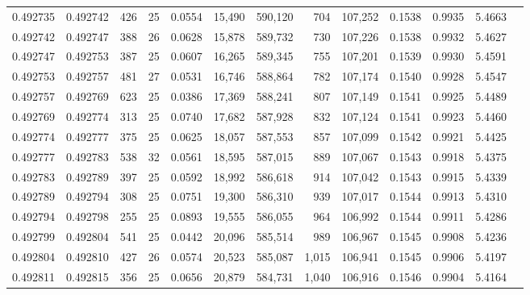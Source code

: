 \begin{tabular}{rrrrrrrrrrrrr}
0.492735 & 0.492742 & 426 &  25 &                                     0.0554 &  15,490 & 590,120 &     704 & 107,252 & 0.1538 & 0.9935 & 5.4663 \\
0.492742 & 0.492747 & 388 &  26 &                                     0.0628 &  15,878 & 589,732 &     730 & 107,226 & 0.1538 & 0.9932 & 5.4627 \\
0.492747 & 0.492753 & 387 &  25 &                                     0.0607 &  16,265 & 589,345 &     755 & 107,201 & 0.1539 & 0.9930 & 5.4591 \\
0.492753 & 0.492757 & 481 &  27 &                                     0.0531 &  16,746 & 588,864 &     782 & 107,174 & 0.1540 & 0.9928 & 5.4547 \\
0.492757 & 0.492769 & 623 &  25 &                                     0.0386 &  17,369 & 588,241 &     807 & 107,149 & 0.1541 & 0.9925 & 5.4489 \\
0.492769 & 0.492774 & 313 &  25 &                                     0.0740 &  17,682 & 587,928 &     832 & 107,124 & 0.1541 & 0.9923 & 5.4460 \\
0.492774 & 0.492777 & 375 &  25 &                                     0.0625 &  18,057 & 587,553 &     857 & 107,099 & 0.1542 & 0.9921 & 5.4425 \\
0.492777 & 0.492783 & 538 &  32 &                                     0.0561 &  18,595 & 587,015 &     889 & 107,067 & 0.1543 & 0.9918 & 5.4375 \\
0.492783 & 0.492789 & 397 &  25 &                                     0.0592 &  18,992 & 586,618 &     914 & 107,042 & 0.1543 & 0.9915 & 5.4339 \\
0.492789 & 0.492794 & 308 &  25 &                                     0.0751 &  19,300 & 586,310 &     939 & 107,017 & 0.1544 & 0.9913 & 5.4310 \\
0.492794 & 0.492798 & 255 &  25 &                                     0.0893 &  19,555 & 586,055 &     964 & 106,992 & 0.1544 & 0.9911 & 5.4286 \\
0.492799 & 0.492804 & 541 &  25 &                                     0.0442 &  20,096 & 585,514 &     989 & 106,967 & 0.1545 & 0.9908 & 5.4236 \\
0.492804 & 0.492810 & 427 &  26 &                                     0.0574 &  20,523 & 585,087 &   1,015 & 106,941 & 0.1545 & 0.9906 & 5.4197 \\
0.492811 & 0.492815 & 356 &  25 &                                     0.0656 &  20,879 & 584,731 &   1,040 & 106,916 & 0.1546 & 0.9904 & 5.4164 \\

\end{tabular}
